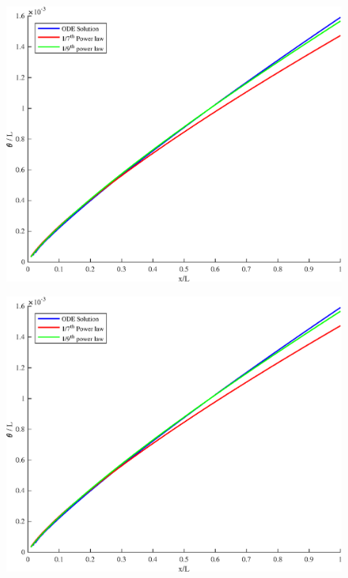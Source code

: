 


\begin{figure}[H]
\centering
\includegraphics[scale=0.53]{week_2/graphs/e4g1.eps}
\caption{}
\label{e6g1}
\end{figure}

\begin{figure}[H]
\centering
\includegraphics[scale=0.53]{week_2/graphs/e4g1.eps}
\caption{}
\label{e6g2}
\end{figure}

